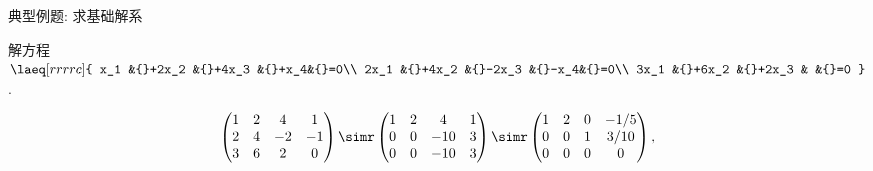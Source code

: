 \begin{frame}{典型例题: 求基础解系}
	\onslide<+->
	\begin{example}
		解方程 $\laeq[rrrrc]{
			x_1  &{}+2x_2 &{}+4x_3 &{}+x_4&{}=0\\
			2x_1 &{}+4x_2 &{}-2x_3 &{}-x_4&{}=0\\
			3x_1 &{}+6x_2 &{}+2x_3 &      &{}=0
		}$.
	\end{example}
	\onslide<+->
	\begin{solution}
		\[\begin{pmatrix}
			1&2&4&1\\
			2&4&-2&-1\\
			3&6&2&0
		\end{pmatrix}\simr\begin{pmatrix}
			1&2&4&1\\
			0&0&-10&3\\
			0&0&-10&3
		\end{pmatrix}\simr\begin{pmatrix}
			1&2&0&-1/5\\
			0&0&1&3/10\\
			0&0&0&0
		\end{pmatrix},\]
		\onslide<+->{\[
			\implies
			\laeq[l]{
				x_1+2x_2-1/5x_4=0\\
				x_3+3/10x_4=0
			}\]}
	\end{solution}
\end{frame}


